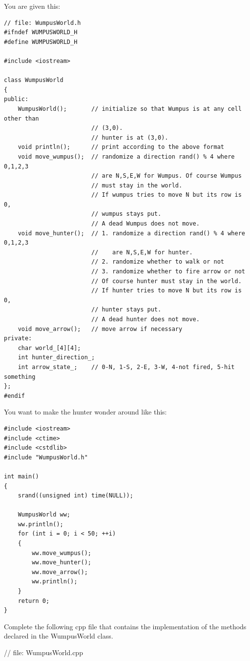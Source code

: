 You are given this:
\begin{Verbatim}[frame=single,fontsize=\footnotesize]
// file: WumpusWorld.h
#ifndef WUMPUSWORLD_H
#define WUMPUSWORLD_H

#include <iostream>

class WumpusWorld
{
public:
    WumpusWorld();       // initialize so that Wumpus is at any cell other than
                         // (3,0).
                         // hunter is at (3,0).
    void println();      // print according to the above format
    void move_wumpus();  // randomize a direction rand() % 4 where 0,1,2,3
                         // are N,S,E,W for Wumpus. Of course Wumpus
                         // must stay in the world.
                         // If wumpus tries to move N but its row is 0,
                         // wumpus stays put.
                         // A dead Wumpus does not move.
    void move_hunter();  // 1. randomize a direction rand() % 4 where 0,1,2,3
                         //    are N,S,E,W for hunter.
                         // 2. randomize whether to walk or not
                         // 3. randomize whether to fire arrow or not
                         // Of course hunter must stay in the world.
                         // If hunter tries to move N but its row is 0,
                         // hunter stays put.
                         // A dead hunter does not move.
    void move_arrow();   // move arrow if necessary
private:
    char world_[4][4];
    int hunter_direction_;
    int arrow_state_;    // 0-N, 1-S, 2-E, 3-W, 4-not fired, 5-hit something
};
#endif
\end{Verbatim}

You want to make the hunter wonder around like this:
\begin{Verbatim}[frame=single,fontsize=\footnotesize]
#include <iostream>
#include <ctime>
#include <cstdlib>
#include "WumpusWorld.h"

int main()
{
    srand((unsigned int) time(NULL));

    WumpusWorld ww;
    ww.println();
    for (int i = 0; i < 50; ++i)
    {
        ww.move_wumpus();
        ww.move_hunter();
        ww.move_arrow();
        ww.println();
    }
    return 0;
}
\end{Verbatim}
Complete the following cpp file that contains the implementation
of the methods declared in the WumpusWorld class.
\\
\ANSWER
\begin{answercode}
// file: WumpusWorld.cpp

\end{answercode}

